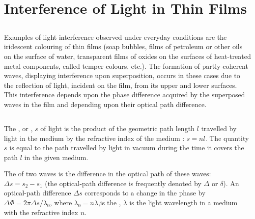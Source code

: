 \section{Interference of Light in Thin Films}
\label{sec-32.3}

\subsection{}\label{32.3.1} Examples of light interference observed under everyday conditions are the iridescent colouring of thin films (soap bubbles, films of petroleum or other oils on the surface of water, transparent
films of oxides on the surfaces of heat-treated metal components, called temper colours, etc.). The formation of partly coherent waves, displaying interference upon superposition, occurs in these cases due to the reflection of light, incident on the film, from its upper and lower surfaces. This interference depends upon the phase difference acquired by the superposed waves in the film and depending upon their optical path difference.

\subsection{}\label{32.3.2} The , or , $s$ of light is the product of the geometric path length $l$ travelled by light in the medium
by the refractive index of the medium : $s = nl$. The quantity $s$ is equal to the path travelled by light in vacuum during the time it covers the path $l$ in the given medium.

The  of two waves is the difference in the optical path of these waves: $\Delta s = s_{2} - s_{1}$ (the optical-path difference is frequently denoted by $\Delta$ or $\delta$). An optical-path difference $\Delta s$ corresponds to a change in the phase by $\Delta \Phi = 2 \pi \Delta s/\lambda_{0}$, where $\lambda_{0} = n \lambda$,is the ,
$\lambda$ is the light wavelength in a medium with the refractive index $n$.

